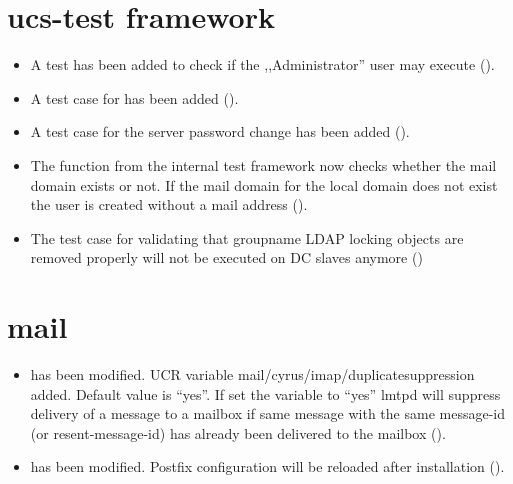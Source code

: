 

\section{ucs-test framework}
\begin{itemize}
\item A test has been added to check if the ,,Administrator'' user may execute
   ().

\item A test case for  has been added ().

\item A test case for the server password change has been added ().

\item The function  from the internal test framework now checks whether the
mail domain exists or not. If the mail domain for the local domain does not exist the user is
created without a mail address ().
\item The test case for validating that groupname LDAP locking objects
  are removed properly will not be executed on DC slaves anymore
  ()


\end{itemize}

\section{mail}
\begin{itemize}
\item {} has been modified. UCR variable mail/cyrus/imap/duplicatesuppression added. Default value is ``yes''. If set the variable to ``yes'' lmtpd will suppress delivery of a message to a mailbox if same message with the same message-id (or resent-message-id) has already been delivered to the mailbox ().

\item {} has been modified. Postfix configuration will be reloaded after installation ().

\end{itemize}

